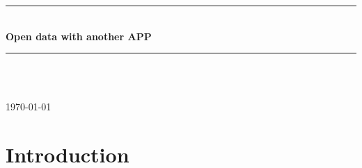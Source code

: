 \documentclass[12pt]{article} %
\begin{document}
	
	
	\begin{titlepage}
		
		\newcommand{\HRule}{\rule{\linewidth}{0.5mm}} %
		
		\center %
		
		\HRule \\[0.4cm]
		{ \huge \bfseries Open data with another APP}\\[0.4cm] %
		\HRule \\[1.5cm]
		
		\begin{minipage}{0.4\textwidth}
		\end{minipage}\\[4cm]
		
		{\large \today}\\[3cm] %
		
		
		\vfill %
		
	\end{titlepage}
	
	
	\tableofcontents %
	
	\newpage %
	
	
	\section{Introduction} %
	
\end{document}
